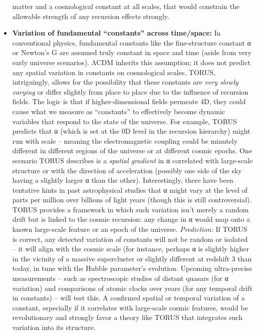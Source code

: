 \begin{itemize}
  matter and a cosmological constant at all scales, that would constrain
  the allowable strength of any recursion effects strongly.
\item
  \textbf{Variation of fundamental ``constants'' across time/space:} In
  conventional physics, fundamental constants like the fine-structure
  constant α or Newton's G are assumed truly constant in space and time
  (aside from very early universe scenarios). ΛCDM inherits this
  assumption; it does not predict any spatial variation in constants on
  cosmological scales. TORUS, intriguingly, allows for the possibility
  that these constants are \emph{very slowly varying} or differ slightly
  from place to place due to the influence of recursion fields. The
  logic is that if higher-dimensional fields permeate 4D, they could
  cause what we measure as ``constants'' to effectively become dynamic
  variables that respond to the state of the universe. For example,
  TORUS predicts that α (which is set at the 0D level in the recursion
  hierarchy) might run with scale -- meaning the electromagnetic
  coupling could be minutely different in different regions of the
  universe or at different cosmic epochs​. One scenario TORUS describes
  is a \emph{spatial gradient} in α correlated with large-scale
  structure or with the direction of acceleration (possibly one side of
  the sky having a slightly larger α than the other)​. Interestingly,
  there have been tentative hints in past astrophysical studies that α
  might vary at the level of parts per million over billions of light
  years (though this is still controversial). TORUS provides a framework
  in which such variation isn't merely a random drift but is linked to
  the cosmic recursion: any change in α would map onto a known
  large-scale feature or an epoch of the universe. \emph{Prediction:} If
  TORUS is correct, any detected variation of constants will not be
  random or isolated -- it will align with the cosmic scale (for
  instance, perhaps α is slightly higher in the vicinity of a massive
  supercluster or slightly different at redshift 3 than today, in tune
  with the Hubble parameter's evolution. Upcoming ultra-precise
  measurements -- such as spectroscopic studies of distant quasars (for
  α variation) and comparisons of atomic clocks over years (for any
  temporal drift in constants) -- will test this​. A confirmed spatial
  or temporal variation of a constant, especially if it correlates with
  large-scale cosmic features, would be revolutionary and strongly favor
  a theory like TORUS that integrates such variation into its structure.

\end{itemize}
